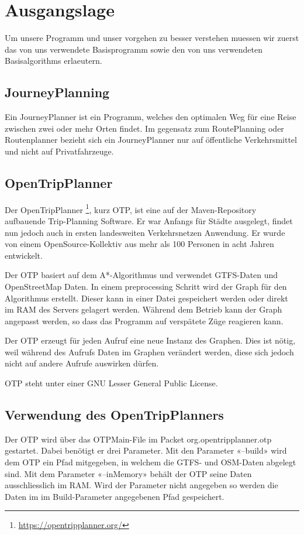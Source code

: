 \section{Ausgangslage}
Um unsere Programm und unser vorgehen zu besser verstehen muessen wir zuerst das von uns verwendete Basisprogramm sowie den von uns verwendeten Basisalgorithms erlaeutern.

\subsection{JourneyPlanning}
Ein JourneyPlanner ist ein Programm, welches den optimalen Weg für eine Reise zwischen zwei oder mehr Orten findet. Im gegensatz zum RoutePlanning oder Routenplanner bezieht sich ein JourneyPlanner nur auf öffentliche Verkehrsmittel und nicht auf Privatfahrzeuge.

\subsection{OpenTripPlanner}

Der OpenTripPlanner \cite{otp} \footnote{\url{https://opentripplanner.org/}}, kurz OTP, ist eine auf der Maven-Repository 
aufbauende Trip-Planning Software. Er war Anfangs für Städte ausgelegt, findet nun jedoch auch in ersten landesweiten Verkehrsnetzen Anwendung. Er wurde von einem OpenSource-Kollektiv aus mehr als 100 Personen in acht Jahren entwickelt.

Der OTP basiert auf dem A*-Algorithmus und verwendet GTFS-Daten und OpenStreetMap Daten. In einem preprocessing Schritt wird der Graph für den Algorithmus erstellt. Dieser kann in einer Datei gespeichert werden oder direkt im RAM des Servers gelagert werden. Während dem Betrieb kann der Graph angepasst werden, so dass das Programm auf verspätete Züge reagieren kann. 

Der OTP erzeugt für jeden Aufruf eine neue Instanz des Graphen. Dies ist nötig, weil während des Aufrufs Daten im Graphen verändert werden, diese sich jedoch nicht auf andere Aufrufe auswirken dürfen.

OTP steht unter einer GNU Lesser General Public License. 


\subsection{Verwendung des OpenTripPlanners}
Der OTP wird über das OTPMain-File im Packet org.opentripplanner.otp gestartet. Dabei benötigt er drei Parameter. Mit den Parameter «--build» wird dem OTP ein Pfad mitgegeben, in welchem die GTFS- und OSM-Daten abgelegt sind. Mit dem Parameter «--inMemory» behält der OTP seine Daten ausschliesslich im RAM. Wird der Parameter nicht angegeben so werden die Daten im im Build-Parameter angegebenen Pfad gespeichert.

